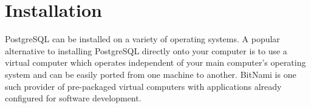 %
%
%
%
%
\section{Installation}
\label{sec:dbinstall}
PostgreSQL can be installed on a variety of operating systems. 
A popular alternative to installing PostgreSQL directly onto your computer is to use a virtual computer which operates independent of your main computer's operating system and can be easily ported from one machine to another.  
BitNami\footnotemark {} is one such provider of  pre-packaged virtual computers with applications already configured for software development. 

